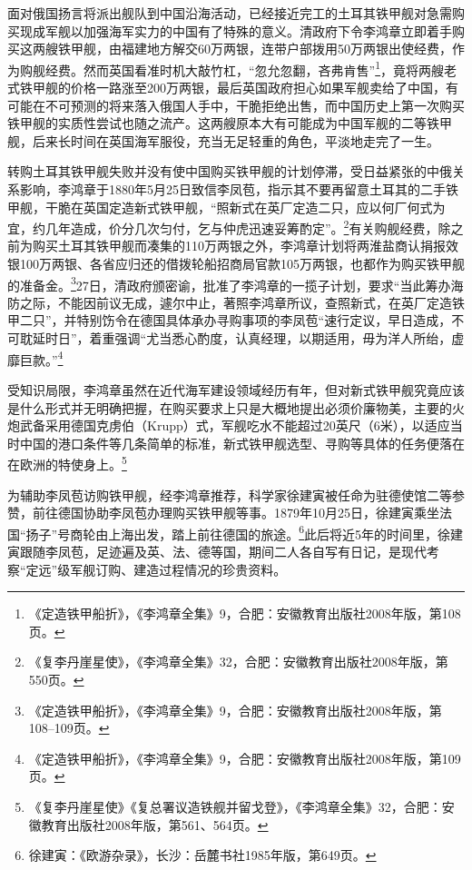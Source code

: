 \documentclass[12pt,UTF8]{ctexbook}
\begin{document}
面对俄国扬言将派出舰队到中国沿海活动，已经接近完工的土耳其铁甲舰对急需购买现成军舰以加强海军实力的中国有了特殊的意义。清政府下令李鸿章立即着手购买这两艘铁甲舰，由福建地方解交60万两银，连带户部拨用50万两银出使经费，作为购舰经费。然而英国看准时机大敲竹杠，“忽允忽翻，吝弗肯售”\footnote{《定造铁甲船折》，《李鸿章全集》9，合肥：安徽教育出版社2008年版，第108页。}，竟将两艘老式铁甲舰的价格一路涨至200万两银，最后英国政府担心如果军舰卖给了中国，有可能在不可预测的将来落入俄国人手中，干脆拒绝出售，而中国历史上第一次购买铁甲舰的实质性尝试也随之流产。这两艘原本大有可能成为中国军舰的二等铁甲舰，后来长时间在英国海军服役，充当无足轻重的角色，平淡地走完了一生。

转购土耳其铁甲舰失败并没有使中国购买铁甲舰的计划停滞，受日益紧张的中俄关系影响，李鸿章于1880年5月25日致信李凤苞，指示其不要再留意土耳其的二手铁甲舰，干脆在英国定造新式铁甲舰，“照新式在英厂定造二只，应以何厂何式为宜，约几年造成，价分几次匀付，乞与仲虎迅速妥筹酌定”。\footnote{《复李丹崖星使》，《李鸿章全集》32，合肥：安徽教育出版社2008年版，第550页。}有关购舰经费，除之前为购买土耳其铁甲舰而凑集的110万两银之外，李鸿章计划将两淮盐商认捐报效银100万两银、各省应归还的借拨轮船招商局官款105万两银，也都作为购买铁甲舰的准备金。\footnote{《定造铁甲船折》，《李鸿章全集》9，合肥：安徽教育出版社2008年版，第108--109页。}27日，清政府颁密谕，批准了李鸿章的一揽子计划，要求“当此筹办海防之际，不能因前议无成，遽尔中止，著照李鸿章所议，查照新式，在英厂定造铁甲二只”，并特别饬令在德国具体承办寻购事项的李凤苞“速行定议，早日造成，不可耽延时日”，着重强调“尤当悉心酌度，认真经理，以期适用，毋为洋人所绐，虚靡巨款。”\footnote{《定造铁甲船折》，《李鸿章全集》9，合肥：安徽教育出版社2008年版，第109页。}

受知识局限，李鸿章虽然在近代海军建设领域经历有年，但对新式铁甲舰究竟应该是什么形式并无明确把握，在购买要求上只是大概地提出必须价廉物美，主要的火炮武备采用德国克虏伯（Krupp）式，军舰吃水不能超过20英尺（6米），以适应当时中国的港口条件等几条简单的标准，新式铁甲舰选型、寻购等具体的任务便落在在欧洲的特使身上。\footnote{《复李丹崖星使》《复总署议造铁舰并留戈登》，《李鸿章全集》32，合肥：安徽教育出版社2008年版，第561、564页。}

为辅助李凤苞访购铁甲舰，经李鸿章推荐，科学家徐建寅被任命为驻德使馆二等参赞，前往德国协助李凤苞办理购买铁甲舰等事。1879年10月25日，徐建寅乘坐法国“扬子”号商轮由上海出发，踏上前往德国的旅途。\footnote{徐建寅：《欧游杂录》，长沙：岳麓书社1985年版，第649页。}此后将近5年的时间里，徐建寅跟随李凤苞，足迹遍及英、法、德等国，期间二人各自写有日记，是现代考察“定远”级军舰订购、建造过程情况的珍贵资料。
\end{document}
